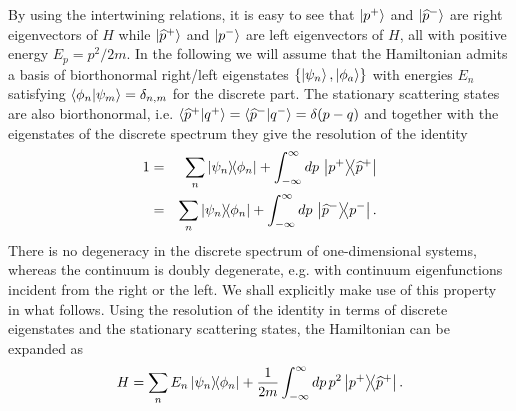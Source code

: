 By using the intertwining relations, it is easy to see that $\ket{p^+}$ and $\ket{\widehat{p}^-}$ are right eigenvectors of $H$ while $\ket{\widehat{p}^+}$ and $\ket{p^-}$ are left eigenvectors of $H$, all with positive energy $E_p = p^2/2m$. In the following we will assume that the Hamiltonian admits a basis of biorthonormal
right/left eigenstates $\left\{ \ket{\psi_n} , \ket{\phi_a} \right\}$ with energies $E_n$ satisfying $\braket{\phi_n}{\psi_m} = \delta_{n,m}$ for the discrete part. The stationary scattering states are also biorthonormal, i.e. $\braket{\widehat{p}^+}{q^+} = \braket{\widehat{p}^-}{q^-} = \delta (p-q)$ and together with the eigenstates of the discrete spectrum they give the resolution of the identity
%
\begin{eqnarray}
    1 &=& \sum_{n}\ketbra{\psi_n}{\phi_n} + \int_{-\infty}^{\infty} dp\, \ketbra{p^+}{\widehat{p}^+}
    \nonumber\\
    &=& \sum_{n}\ketbra{\psi_n}{\phi_n} + \int_{-\infty}^{\infty} dp\, \ketbra{\widehat{p}^-}{p^-}.
    \label{eq:identity}
\end{eqnarray}
%
There is no degeneracy in the discrete spectrum of one-dimensional systems, whereas the continuum is doubly degenerate,
e.g. with continuum eigenfunctions incident from the right or the left.  We shall explicitly make use of this property in what follows. Using the resolution of the identity in terms of discrete eigenstates and the stationary scattering states, the Hamiltonian can be expanded as
%
\begin{equation}
    H = \sum_{n}E_n\ketbra{\psi_n}{\phi_n} + \frac{1}{2m}\int_{-\infty}^{\infty} dp\,p^2 \ketbra{p^+}{\widehat{p}^+}.
    \label{eq:H_Expansion_Continuous}
\end{equation}
%

